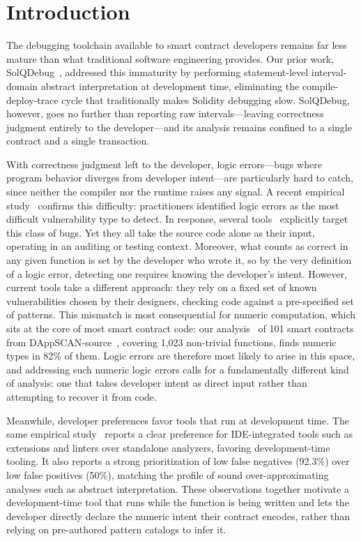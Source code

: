 \documentclass[pdflatex,sn-basic]{sn-jnl}%
\theoremstyle{thmstyleone}%
\theoremstyle{thmstyletwo}%
\theoremstyle{thmstylethree}%
\begin{document}
\section{Introduction}

The debugging toolchain available to smart contract developers remains far less mature than what traditional software engineering provides.
Our prior work, SolQDebug~\citep{solqdebug}, addressed this immaturity by performing statement-level interval-domain abstract interpretation at development time, eliminating the compile-deploy-trace cycle that traditionally makes Solidity debugging slow.
SolQDebug, however, goes no further than reporting raw intervals---leaving correctness judgment entirely to the developer---and its analysis remains confined to a single contract and a single transaction.

With correctness judgment left to the developer, logic errors---bugs where program behavior diverges from developer intent---are particularly hard to catch, since neither the compiler nor the runtime raises any signal.
A recent empirical study~\citep{defisecurity} confirms this difficulty: practitioners identified logic errors as the most difficult vulnerability type to detect.
In response, several tools~\citep{numscout, gptscan, sctype} explicitly target this class of bugs.
Yet they all take the source code alone as their input, operating in an auditing or testing context.
Moreover, what counts as correct in any given function is set by the developer who wrote it, so by the very definition of a logic error, detecting one requires knowing the developer's intent.
However, current tools take a different approach: they rely on a fixed set of known vulnerabilities chosen by their designers, checking code against a pre-specified set of patterns.
This mismatch is most consequential for numeric computation, which sits at the core of most smart contract code: our analysis~\citep{dappscananalysis} of 101 smart contracts from DAppSCAN-source~\citep{dappscan}, covering 1,023 non-trivial functions, finds numeric types in 82\% of them.
Logic errors are therefore most likely to arise in this space, and addressing such numeric logic errors calls for a fundamentally different kind of analysis: one that takes developer intent as direct input rather than attempting to recover it from code.

Meanwhile, developer preferences favor tools that run at development time. The same empirical study~\citep{defisecurity} reports a clear preference for IDE-integrated tools such as extensions and linters over standalone analyzers, favoring development-time tooling. It also reports a strong prioritization of low false negatives (92.3\%) over low false positives (50\%), matching the profile of sound over-approximating analyses such as abstract interpretation.
These observations together motivate a development-time tool that runs while the function is being written and lets the developer directly declare the numeric intent their contract encodes, rather than relying on pre-authored pattern catalogs to infer it.
\end{document}

